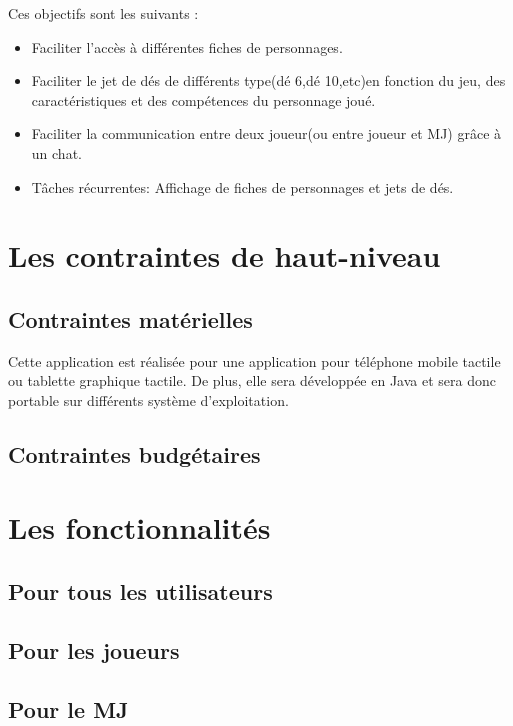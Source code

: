 \documentclass[11pt,a4paper]{article}
\begin{document}
Ces objectifs sont les suivants :

\begin{itemize}
  \item Faciliter l'accès à différentes fiches de personnages.
  \item Faciliter le jet de dés de différents type(dé 6,dé 10,etc)en fonction
  du jeu, des caractéristiques et des compétences du personnage joué.
  \item Faciliter la communication entre deux joueur(ou entre joueur et MJ)
  grâce à un chat.
  \item Tâches récurrentes: Affichage de fiches de personnages et jets de dés.
\end{itemize}

\clearpage

\section{Les contraintes de haut-niveau}

\subsection{Contraintes matérielles}

Cette application est réalisée pour une application pour téléphone mobile
tactile ou tablette graphique tactile. De plus, elle sera développée en Java et
sera donc portable sur différents système d'exploitation.

\subsection{Contraintes budgétaires}


\section{Les fonctionnalités}
\subsection{Pour tous les utilisateurs}
\subsection{Pour les joueurs}
\subsection{Pour le MJ}

\clearpage
  
\end{document}
